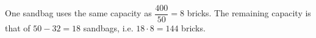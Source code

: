 One sandbag uses the same capacity as $\dfrac{400}{50}=8$ bricks. The remaining capacity is that of $50-32=18$ sandbags, i.e. $18\cdot8=\boxed{144}$ bricks.
